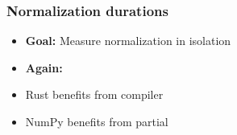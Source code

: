 \documentclass[t,english]{beamer}
\begin{document}
\begin{frame}
  \frametitle{Normalization durations}
  \begin{itemize}
    \item \textbf{Goal:} Measure normalization in isolation
  \end{itemize}

  \begin{itemize}
    \item<3-> \textbf{Again:}
    \item<3-> Rust benefits from compiler
    \item<3->  NumPy benefits from partial
  \end{itemize}
\end{frame}
\end{document}

